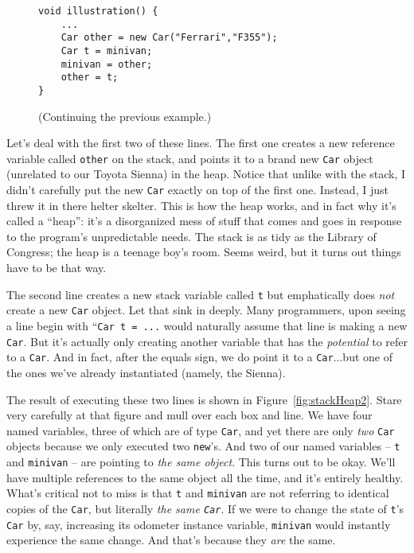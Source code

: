 \begin{figure}
\begin{Verbatim}[fontsize=\small,samepage=true,frame=single]
void illustration() {
    ...
    Car other = new Car("Ferrari","F355");
    Car t = minivan;
    minivan = other;
    other = t;
}
\end{Verbatim}
\caption{(Continuing the previous example.)}
\label{fig:additionalCode}
\end{figure}

Let's deal with the first two of these lines. The first one creates a new
reference variable called \texttt{other} on the stack, and points it to a
brand new \texttt{Car} object (unrelated to our Toyota Sienna) in the heap.
Notice that unlike with the stack, I didn't carefully put the new \texttt{Car}
exactly on top of the first one. Instead, I just threw it in there helter
skelter. This is how the heap works, and in fact why it's called a ``heap'':
it's a disorganized mess of stuff that comes and goes in response to the
program's unpredictable needs. The stack is as tidy as the Library of
Congress; the heap is a teenage boy's room. Seems weird, but it turns out
things have to be that way.

The second line creates a new stack variable called \texttt{t} but
emphatically does \textit{not} create a new \texttt{Car} object. Let that sink
in deeply. Many programmers, upon seeing a line begin with ``\texttt{Car t =
...} would naturally assume that line is making a new \texttt{Car}. But it's
actually only creating another variable that has the \textit{potential} to
refer to a \texttt{Car}. And in fact, after the equals sign, we do point it to
a \texttt{Car}...but one of the ones we've already instantiated (namely, the
Sienna).

The result of executing these two lines is shown in
Figure~\ref{fig:stackHeap2}. Stare very carefully at that figure and mull over
each box and line. We have four named variables, three of which are of type
\texttt{Car}, and yet there are only \textit{two} \texttt{Car} objects because
we only executed two \texttt{new}'s. And two of our named variables --
\texttt{t} and \texttt{minivan} -- are pointing to \textit{the same object}.
This turns out to be okay. We'll have multiple references to the same object
all the time, and it's entirely healthy. What's critical not to miss is that
\texttt{t} and \texttt{minivan} are not referring to identical copies of the
\texttt{Car}, but literally \textit{the same \texttt{Car}}. If we were to
change the state of \texttt{t}'s \texttt{Car} by, say, increasing its odometer
instance variable, \texttt{minivan} would instantly experience the same
change. And that's because they \textit{are} the same. 

